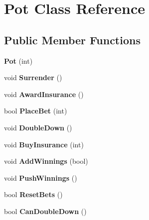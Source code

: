 \hypertarget{class_pot}{}\section{Pot Class Reference}
\label{class_pot}
\subsection*{Public Member Functions}
\begin{DoxyCompactItemize}
\item 
{\bfseries Pot} (int)\hypertarget{class_pot_ae1fecaba6730af51a13cf57726f2e304}{}\label{class_pot_ae1fecaba6730af51a13cf57726f2e304}

\item 
void {\bfseries Surrender} ()\hypertarget{class_pot_af008469167881eedc2b4fa3d98ea0b65}{}\label{class_pot_af008469167881eedc2b4fa3d98ea0b65}

\item 
void {\bfseries Award\+Insurance} ()\hypertarget{class_pot_a9027b38cb7027e4229c1f52d4b15910c}{}\label{class_pot_a9027b38cb7027e4229c1f52d4b15910c}

\item 
bool {\bfseries Place\+Bet} (int)\hypertarget{class_pot_a9932b87968829937f62d7dd60e11046e}{}\label{class_pot_a9932b87968829937f62d7dd60e11046e}

\item 
void {\bfseries Double\+Down} ()\hypertarget{class_pot_afccb26a065de8c5192acd72b1dff217d}{}\label{class_pot_afccb26a065de8c5192acd72b1dff217d}

\item 
void {\bfseries Buy\+Insurance} (int)\hypertarget{class_pot_a5e1e06ffa0cd7a74087297a84cfeb17f}{}\label{class_pot_a5e1e06ffa0cd7a74087297a84cfeb17f}

\item 
void {\bfseries Add\+Winnings} (bool)\hypertarget{class_pot_afa6a1574446fdc8fb3450095e6586944}{}\label{class_pot_afa6a1574446fdc8fb3450095e6586944}

\item 
void {\bfseries Push\+Winnings} ()\hypertarget{class_pot_a9e3e905d1cf6759db2105dabf22fc454}{}\label{class_pot_a9e3e905d1cf6759db2105dabf22fc454}

\item 
bool {\bfseries Reset\+Bets} ()\hypertarget{class_pot_a7ec1ff4578b4cec267e652876297897f}{}\label{class_pot_a7ec1ff4578b4cec267e652876297897f}

\item 
bool {\bfseries Can\+Double\+Down} ()\hypertarget{class_pot_af6a1e26563014a493c1fd6b0c7d1f48e}{}\label{class_pot_af6a1e26563014a493c1fd6b0c7d1f48e}


\end{DoxyCompactItemize}
